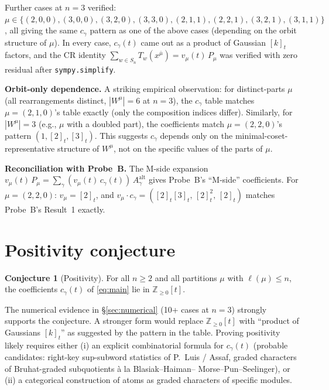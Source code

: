 \documentclass[11pt]{article}
\theoremstyle{definition}
\newtheorem{conjecture}[theorem]{Conjecture}
\begin{document}
Further cases at $n=3$ verified: $\mu \in \{(2,0,0), (3,0,0), (3,2,0),
(3,3,0), (2,1,1), (2,2,1), (3,2,1), (3,1,1)\}$, all giving the same
$c_\gamma$ pattern as one of the above cases (depending on the orbit
structure of $\mu$). In every case, $c_\gamma(t)$ came out as a product
of Gaussian $[k]_t$ factors, and the CR identity
$\sum_{w \in S_n} T_w(x^{\bar\mu}) = v_\mu(t)\,P_\mu$ was verified with
zero residual after \texttt{sympy.simplify}.

\textbf{Orbit-only dependence.} A striking empirical observation: for
distinct-parts $\mu$ (all rearrangements distinct, $|W^\mu| = 6$ at $n=3$),
the $c_\gamma$ table matches $\mu = (2,1,0)$'s table exactly (only the
composition indices differ). Similarly, for $|W^\mu| = 3$ (e.g., $\mu$
with a doubled part), the coefficients match $\mu = (2,2,0)$'s pattern
$(1, [2]_t, [3]_t)$. This suggests $c_\gamma$ depends only on the
minimal-coset-representative structure of $W^\mu$, not on the specific
values of the parts of $\mu$.

\textbf{Reconciliation with Probe~B.} The M-side expansion
$v_\mu(t)\, P_\mu = \sum_\gamma (v_\mu(t)\, c_\gamma(t))\, A^{\mathrm{alt}}_\gamma$
gives Probe~B's ``M-side'' coefficients. For $\mu = (2,2,0)$:
$v_\mu = [2]_t$, and $v_\mu\cdot c_\gamma = ([2]_t[3]_t,\, [2]_t^2,\, [2]_t)$
matches Probe~B's Result~1 exactly.

\section{Positivity conjecture}

\begin{conjecture}[Positivity]\label{conj:positivity}
For all $n \ge 2$ and all partitions $\mu$ with $\ell(\mu) \le n$, the
coefficients $c_\gamma(t)$ of \eqref{eq:main} lie in $\mathbb{Z}_{\ge 0}[t]$.
\end{conjecture}

The numerical evidence in \S\ref{sec:numerical} (10+ cases at $n = 3$)
strongly supports the conjecture. A stronger form would replace
$\mathbb{Z}_{\ge 0}[t]$ with ``product of Gaussians $[k]_t$'' as suggested
by the pattern in the table. Proving positivity likely requires either
(i) an explicit combinatorial formula for $c_\gamma(t)$ (probable
candidates: right-key sup-subword statistics of P.\ Luis / Assaf,
graded characters of Bruhat-graded subquotients \`a la Blasiak--Haiman--
Morse--Pun--Seelinger), or (ii) a categorical construction of atoms as
graded characters of specific modules.
\end{document}
